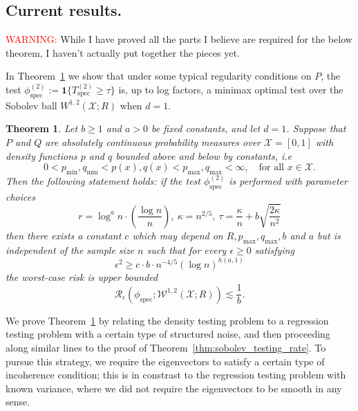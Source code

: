 \documentclass{article}
\newcommand{\1}{\mathbf{1}}
\newcommand{\spec}{\mathrm{spec}}
\theoremstyle{alden}
\theoremstyle{aldenthm}
\newtheorem{theorem}{Theorem}
\theoremstyle{definition}
\theoremstyle{remark}
\begin{document}
\subsection{Current results.}

\textcolor{red}{WARNING:} While I have proved all the parts I believe are required for the below theorem, I haven't actually put together the pieces yet.

In Theorem~\ref{thm:twosample_sobolev_testing_rate} we show that under some typical regularity conditions on $P$, the test $\phi_{\textrm{spec}}^{(2)} := \1\{T_{\mathrm{spec}}^{(2)} \geq \tau\}$ is, up to log factors, a minimax optimal test over the Sobolev ball $W^{1,2}(\mathcal{X};R)$ when $d = 1$.

\begin{theorem}
	\label{thm:twosample_sobolev_testing_rate}
	Let $b \geq 1$ and $a > 0$ be fixed constants, and let $d = 1$.  Suppose that $P$ and $Q$ are absolutely continuous probability measures over $\mathcal{X} = [0,1]$ with density functions $p$ and $q$ bounded above and below by constants, i.e
	\begin{equation*}
	0 < p_{\min},q_{\min} < p(x),q(x) < p_{\max},q_{\max} < \infty, \quad \textrm{for all $x \in \mathcal{X}$.}
	\end{equation*}
	Then the following statement holds: if the test $\phi_{\spec}^{(2)}$ is performed with parameter choices 
	\begin{equation*}
	r = \log^a n \cdot \left(\frac{\log n}{n}\right), ~\kappa = n^{2/5}, ~\tau = \frac{\kappa}{n} + b\sqrt{\frac{2\kappa}{n^2}}
	\end{equation*}
	then there exists a constant $c$ which may depend on $R,p_{\max},q_{\max},b$ and $a$ but is independent of the sample size $n$ such that for every $\epsilon \geq 0$ satisfying
	\begin{equation}
	\label{eqn:twosample_sobolev_testing_rate}
	\epsilon^2 \geq c \cdot b \cdot n^{-4/5} (\log n)^{h(a,1)}
	\end{equation}
	the worst-case risk is upper bounded
	\begin{equation}
	\label{eqn:twosample_sobolev_testing_rate_1}
	\mathcal{R}_{\epsilon}(\phi_{\mathrm{spec}}; \mathcal{W}^{1,2}(\mathcal{X};R)) \lesssim \frac{1}{b}.
	\end{equation}
\end{theorem}

We prove Theorem~\ref{thm:twosample_sobolev_testing_rate} by relating the density testing problem to a regression testing problem with a certain type of structured noise, and then proceeding along similar lines to the proof of Theorem~\ref{thm:sobolev_testing_rate}. To pursue this strategy, we require the eigenvectors to satisfy a certain type of incoherence condition; this is in constrast to the regression testing problem with known variance, where we did not require the eigenvectors to be smooth in any sense.
\end{document}
